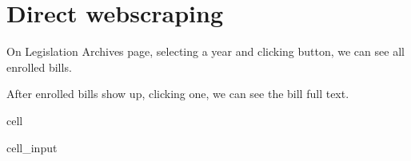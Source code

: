 \documentclass[letterpaper,10pt,english]{jupyterBook}
\begin{document}
\section{Direct webscraping}
\label{\detokenize{ch53:direct-webscraping}}
\sphinxAtStartPar
On Legislation Archives page, selecting a year and clicking  button, we can see all enrolled bills. 

\sphinxAtStartPar
After enrolled bills show up, clicking one, we can see the bill full text.

\sphinxAtStartPar
{}

\begin{sphinxuseclass}{cell}\begin{sphinxVerbatimInput}

\begin{sphinxuseclass}{cell_input}
\begin{sphinxVerbatim}[commandchars=\\\{\}]
  \PYG{p}{[}\PYG{p}{]}


\end{sphinxVerbatim}
\end{sphinxuseclass}
\end{sphinxVerbatimInput}
\end{sphinxuseclass}
\end{document}
